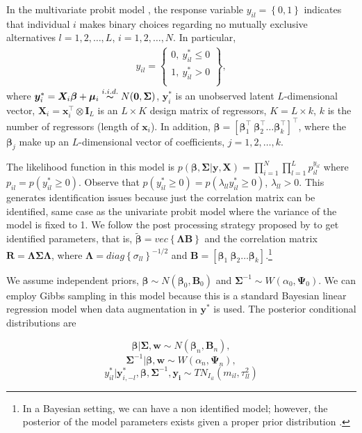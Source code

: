 In the multivariate probit model \cite{Edwards2003}, the response variable $y_{il}=\left\{0,1\right\}$ indicates that individual $i$ makes binary choices regarding no mutually exclusive alternatives $l=1,2,\dots,L$, $i=1,2,\dots,N$. In particular,
\begin{align*}
	y_{il}=\begin{Bmatrix}
		0, \ y_{il}^*\leq 0 \\ 
		1, \ y_{il}^*> 0 \\ 
	\end{Bmatrix},
\end{align*}
where $\bm{y}_{i}^*=\bm{X}_{i}\bm{\beta}+\bm{\mu}_{i}\stackrel{i.i.d.} {\thicksim}{N}(\bm0,\bm{\Sigma})$, $\bm{y}_i^*$ is an unobserved latent $L$-dimensional vector, $\bm{X}_{i}=\bm{x}_i^{\top} \otimes \bm{I}_L$ is an $L\times K$ design matrix of regressors, $K=L\times k$, $k$ is the number of regressors (length of $\bm{x}_i$). In addition, $\bm{\beta}=\left[\bm{\beta}_1^{\top} \ \bm{\beta}_2^{\top} \dots  \bm{\beta}_k^{\top}\right]^{\top}$, where the $\bm{\beta}_j$ make up an $L$-dimensional vector of coefficients, $j=1,2,\dots,k$.

The likelihood function in this model is $p(\bm{\beta},\bm{\Sigma}|\bm{y},\bm{X})=\prod_{i=1}^N\prod_{l=1}^L p_{il}^{y_{il}}$ where $p_{il}=p(y_{il}^*\geq 0)$.
Observe that $p({y}_{il}^*\geq 0)=p({\lambda}_{ll}{y}_{il}^*\geq 0)$, $\lambda_{ll}>0$. This generates identification issues because just the correlation matrix can be identified, same case as the univariate probit model where the variance of the model is fixed to 1. We follow the post processing strategy proposed by \cite{Edwards2003} to get identified parameters, that is, $\tilde{\bm{\beta}}=vec\left\{\bm{\Lambda}\bm{B}\right\}$ and the correlation matrix $\bm{R}=\bm{\Lambda}\bm{\Sigma}\bm{\Lambda}$, where $\bm{\Lambda}=diag\left\{\sigma_{ll}\right\}^{-1/2}$ and $\bm{B}=\left[\bm{\beta}_1 \ \bm{\beta}_2\dots \bm{\beta}_k\right]$.\footnote{In a Bayesian setting, we can have a non identified model; however, the posterior of the model parameters exists given a proper prior distribution \cite{Edwards2003}.}

We assume independent priors, $\bm{\beta}\sim{N}(\bm{\beta}_0,\bm{B}_0)$ and $\bm{\Sigma}^{-1}\sim{W}(\alpha_0,\bm{\Psi}_0)$.
We can employ Gibbs sampling in this model because this is a standard Bayesian linear regression model when data augmentation in $\bm{y}^*$ is used.
The posterior conditional distributions are

\begin{equation*}
	\bm{\beta}|\bm{\Sigma},\bm{w}\sim{N}(\bm{\beta}_n,\bm{B}_n),
\end{equation*}
\begin{equation*}
	\bm{\Sigma}^{-1}|\bm{\beta},\bm{w}\sim{W}(\alpha_n,\bm{\Psi}_n),
\end{equation*}
\begin{equation*}
	y_{il}^*|\bm{y}_{i,-l}^*,\bm{\beta},\bm{\Sigma}^{-1},\bm{y_i}\sim{T}{N}_{I_{il}}(m_{il},\tau_{ll}^2)
\end{equation*}

